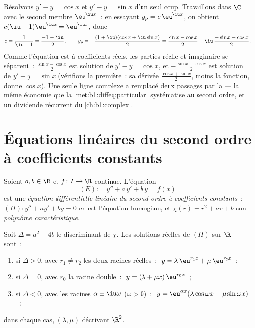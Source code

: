 \begin{example}\label{ex:b1:diffeq:complexrhs}
Résolvons $y' - y = \cos x$ et $y' - y = \sin x$ d'un seul coup.
Travaillons dans $\C$ avec le second membre $\eu^{\iu x}$~: en
essayant $y_p = c\,\eu^{\iu x}$, on obtient $c(\iu - 1)\eu^{\iu x} =
\eu^{\iu x}$, donc
\[
c = \frac1{\iu - 1} = \frac{-1 - \iu}2,
\qquad
y_p = -\frac{(1 + \iu)(\cos x + \iu\sin x)}2
= \frac{\sin x - \cos x}2 + \iu\,\frac{-\sin x - \cos x}2 .
\]
Comme l'équation est à coefficients réels, les parties réelle et
imaginaire se séparent~: $\frac{\sin x - \cos x}2$ est solution de
$y' - y = \cos x$, et $-\frac{\sin x + \cos x}2$ est solution de
$y' - y = \sin x$ (vérifions la première~: sa dérivée $\frac{\cos x +
\sin x}2$, moins la fonction, donne $\cos x$). Une seule ligne
complexe a remplacé deux passages par la  ---
la même économie que la \cref{met:b1:diffeq:particular} systématise au
second ordre, et un dividende récurrent du \cref{ch:b1:complex}.
\end{example}

\section{Équations linéaires du second ordre à coefficients constants}

\begin{definition}\label{def:b1:diffeq:linear2}
Soient $a, b \in \R$ et $f \colon I \to \R$ continue. L'équation
\[
(E)\colon\quad y'' + a\,y' + b\,y = f(x)
\]
est une \emph{équation différentielle linéaire du second ordre à
coefficients constants}~; $(H)\colon y'' + ay' + by = 0$ en est l'équation
homogène, et $\chi(r) = r^2 + ar + b$ son \emph{polynôme
caractéristique}.
\end{definition}

\begin{theorem}\label{thm:b1:diffeq:homogeneous2}
Soit $\Delta = a^2 - 4b$ le discriminant de $\chi$. Les solutions
réelles de $(H)$ sur $\R$ sont~:
\begin{enumerate}
  \item si $\Delta > 0$, avec $r_1 \neq r_2$ les deux racines réelles~:
        $\;y = \lambda\, \eu^{r_1 x} + \mu\, \eu^{r_2 x}$~;
  \item si $\Delta = 0$, avec $r_0$ la racine double~:
        $\;y = (\lambda + \mu x)\, \eu^{r_0 x}$~;
  \item si $\Delta < 0$, avec les racines $\alpha \pm \iu\omega$
        ($\omega > 0$)~:
        $\;y = \eu^{\alpha x} (\lambda \cos\omega x + \mu
        \sin\omega x)$~;
\end{enumerate}
dans chaque cas, $(\lambda, \mu)$ décrivant $\R^2$.
\end{theorem}

